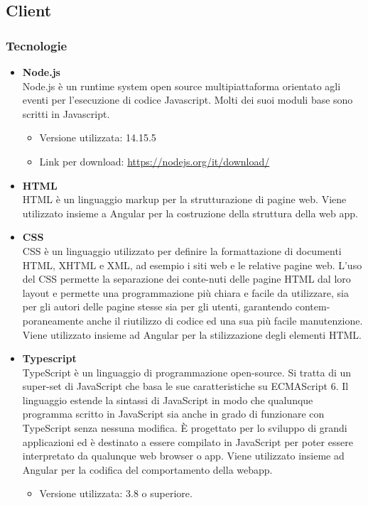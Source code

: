\subsection{Client}

\subsubsection{Tecnologie}

\begin{itemize}
	\item \textbf{Node.js} \\
	Node.js è un runtime system open source multipiattaforma orientato agli eventi per l'esecuzione di codice Javascript. Molti dei suoi moduli base sono scritti in Javascript. 
	\begin{itemize}
		\item Versione utilizzata: 14.15.5
		\item Link per download: \url{https://nodejs.org/it/download/}
	\end{itemize}
	
	\item \textbf{HTML} \\
	HTML è un linguaggio markup per la strutturazione di pagine web. Viene utilizzato insieme a Angular per la costruzione della struttura della web app.

	\item \textbf{CSS} \\
	CSS è un linguaggio utilizzato per definire la formattazione di documenti HTML, XHTML e XML, ad esempio i siti web e le relative pagine web. L'uso del CSS permette la separazione dei conte-nuti delle pagine HTML dal loro layout e permette una programmazione più chiara e facile da utilizzare, sia per gli autori delle pagine stesse sia per gli utenti, garantendo contem-poraneamente anche il riutilizzo di codice ed una sua più facile manutenzione. Viene utilizzato insieme ad Angular per la stilizzazione degli elementi HTML.
	\item \textbf{Typescript}\\
	TypeScript è un linguaggio di programmazione open-source. Si tratta di un super-set di JavaScript che basa le sue caratteristiche su ECMAScript 6. Il linguaggio estende la sintassi di JavaScript in modo che qualunque programma scritto in JavaScript sia anche in grado di funzionare con TypeScript senza nessuna modifica. È progettato per lo sviluppo di grandi applicazioni ed è destinato a essere compilato in JavaScript per poter essere interpretato da qualunque web browser o app. Viene utilizzato insieme ad Angular per la codifica del comportamento della webapp.
	\begin{itemize}
		\item Versione utilizzata: 3.8 o superiore.
	\end{itemize}

\end{itemize}

